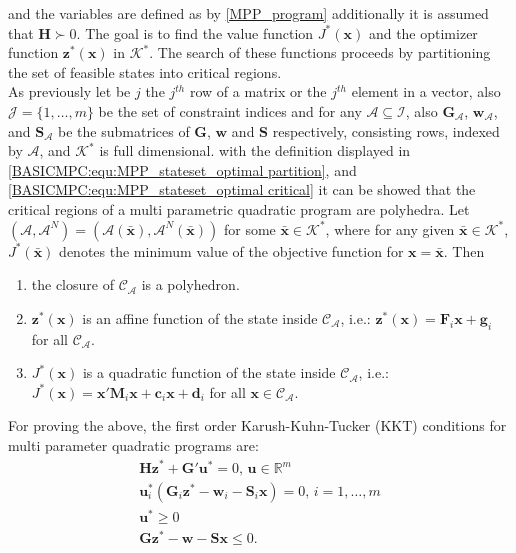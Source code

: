     and the variables are defined as by \ref{MPP_program} additionally it is assumed that $\textbf{H}\succ 0$. The goal is to find the value function $J^*(\textbf{x})$ and the optimizer function $\textbf{z}^*(\textbf{x})$ in $\mathcal{K}^*$. The search of these functions proceeds by partitioning the set of feasible states into critical regions.\\
    As previously let be $j$ the $j^{th}$ row of a matrix or the $j^{th}$ element in a vector, also $\mathcal{J}=\{1,\dots,m\}$ be the set of constraint indices and for any $\mathcal{A}\subseteq\mathcal{I}$, also $\textbf{G}_{\mathcal{A}}$, $\textbf{w}_{\mathcal{A}}$, and $\textbf{S}_{\mathcal{A}}$ be the submatrices of $\textbf{G}$, $\textbf{w}$ and $\textbf{S}$ respectively, consisting rows, indexed by $\mathcal{A}$, and $\mathcal{K}^*$ is full dimensional.
    with the definition displayed in \ref{BASICMPC:equ:MPP_stateset_optimal partition}, and \ref{BASICMPC:equ:MPP_stateset_optimal critical} it can be showed that the critical regions of a multi parametric quadratic program are polyhedra. Let $(\mathcal{A},\mathcal{A}^N)=(\mathcal{A}(\bar{\textbf{x}}),\mathcal{A}^N(\bar{\textbf{x}}))$ for some $\bar{\textbf{x}}\in\mathcal{K}^*$, where for any given $\bar{\textbf{x}}\in\mathcal{K}^*$, $J^*(\bar{\textbf{x}})$ denotes the minimum value of the objective function for $\textbf{x}=\bar{\textbf{x}}$. Then
    \begin{enumerate}
    \item the closure of $\mathcal{C}_{\mathcal{A}}$ is a polyhedron.
    \item $\textbf{z}^*(\textbf{x})$ is an affine function of the state inside $\mathcal{C}_{\mathcal{A}}$, i.e.: $\textbf{z}^*(\textbf{x})=\textbf{F}_i\textbf{x}+\textbf{g}_i$ for all $\mathcal{C}_{\mathcal{A}}$.
    \item $J^*(\textbf{x})$ is a quadratic function of the state inside $\mathcal{C}_{\mathcal{A}}$, i.e.: $J^*(\textbf{x})=\textbf{x}'\textbf{M}_i\textbf{x}+\textbf{c}_i\textbf{x}+\textbf{d}_i$ for all $\textbf{x}\in\mathcal{C}_{\mathcal{A}}$.
    \end{enumerate}
    
    For proving the above, the first order Karush-Kuhn-Tucker (KKT) conditions for multi parameter quadratic programs are:
    \begin{subequations}
    \label{BASICMPC:equ:MPP_KKT}
        \begin{align}
        \textbf{Hz}^*+\textbf{G}'\textbf{u}^*=0,\,\textbf{u}\in\mathbb{R}^m        \label{BASICMPC:equ:MPP_KKT_a} \\
        \textbf{u}^*_i(\textbf{G}_i\textbf{z}^*-\textbf{w}_i-\textbf{S}_i\textbf{x})=0,\,i=1,\dots,m \label{BASICMPC:equ:MPP_KKT_b} \\
        \textbf{u}^*\geq 0 \label{BASICMPC:equ:MPP_KKT_c} \\
        \textbf{G}\textbf{z}^*-\textbf{w}-\textbf{S}\textbf{x}\leq 0 \label{BASICMPC:equ:MPP_KKT_d}.
    \end{align}
    \end{subequations}
    
